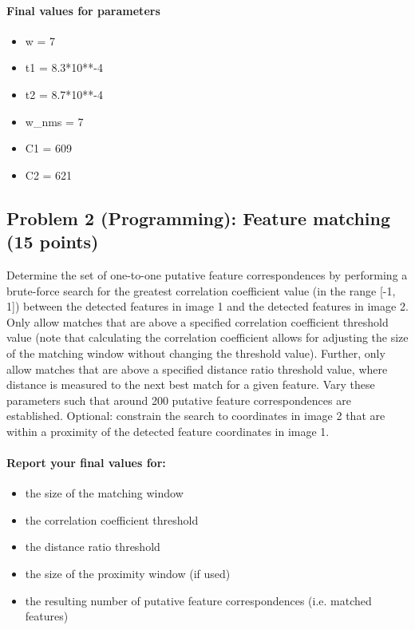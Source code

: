 \documentclass[11pt]{article}
\providecommand{\tightlist}{%
      \setlength{\itemsep}{0pt}\setlength{\parskip}{0pt}}
\begin{document}
    \paragraph{Final values for
parameters}\label{final-values-for-parameters}

\begin{itemize}
\tightlist
\item
  w = 7
\item
  t1 = 8.3*10**-4
\item
  t2 = 8.7*10**-4
\item
  w\_nms = 7
\item
  C1 = 609
\item
  C2 = 621
\end{itemize}

    \subsection{Problem 2 (Programming): Feature matching (15
points)}\label{problem-2-programming-feature-matching-15-points}

Determine the set of one-to-one putative feature correspondences by
performing a brute-force search for the greatest correlation coefficient
value (in the range {[}-1, 1{]}) between the detected features in image
1 and the detected features in image 2. Only allow matches that are
above a specified correlation coefficient threshold value (note that
calculating the correlation coefficient allows for adjusting the size of
the matching window without changing the threshold value). Further, only
allow matches that are above a specified distance ratio threshold value,
where distance is measured to the next best match for a given feature.
Vary these parameters such that around 200 putative feature
correspondences are established. Optional: constrain the search to
coordinates in image 2 that are within a proximity of the detected
feature coordinates in image 1.

\paragraph{Report your final values
for:}\label{report-your-final-values-for}

\begin{itemize}
\tightlist
\item
  the size of the matching window
\item
  the correlation coefficient threshold
\item
  the distance ratio threshold
\item
  the size of the proximity window (if used)
\item
  the resulting number of putative feature correspondences (i.e. matched
  features)
\end{itemize}
\end{document}
